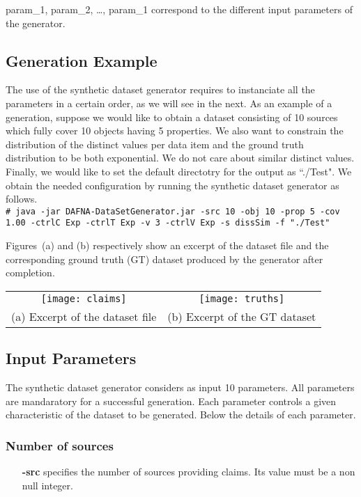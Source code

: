 \documentclass[a4paper,10pt]{scrartcl}
\newcommand{\shellcmd}[1]{\vspace*{1cm}\\\indent\indent\texttt{\# #1}\vspace*{1cm}}
\begin{document}
\noindent param\_1, param\_2, \ldots, param\_1 correspond to the different input parameters
of the generator.


\subsection{Generation Example}
The use of the synthetic dataset generator requires to instanciate all the  parameters in a certain order, as we will see in the next.
As an example of a generation, suppose we would like to obtain a dataset consisting of 10 sources which fully cover  10 objects having 5 
properties. We also want to constrain the distribution of the distinct values per data item and the ground truth distribution to be both exponential.
We do not care about similar distinct values. Finally, we would like to set the default directotry for the output as ``./Test". 
We obtain the needed configuration by running the synthetic dataset generator as follows.
\shellcmd{java -jar DAFNA-DataSetGenerator.jar -src 10 -obj 10 -prop 5 -cov 1.00 -ctrlC Exp -ctrlT Exp -v 3 -ctrlV Exp -s dissSim -f "./Test"}

Figures~(a) and (b) respectively show an excerpt of the dataset file and the corresponding ground truth (GT) dataset produced by the generator
after completion.\\


\begin{tabular}{cc}
\texttt{[image: claims]}&\texttt{[image: truths]}\\
(a) Excerpt of the dataset file & (b) Excerpt of the GT dataset\\
\end{tabular}


\subsection{Input Parameters}
The synthetic dataset generator considers as input 10 parameters.
All parameters are mandaratory for a successful generation. Each 
parameter controls a given characteristic of the dataset to be generated.
Below the details of each parameter.

\subsubsection{Number of sources}
\begin{itemize}
 \item[\textbf{-src}] specifies the number of sources providing claims. Its value must be a non null integer.
 \end{itemize}
\end{document}
